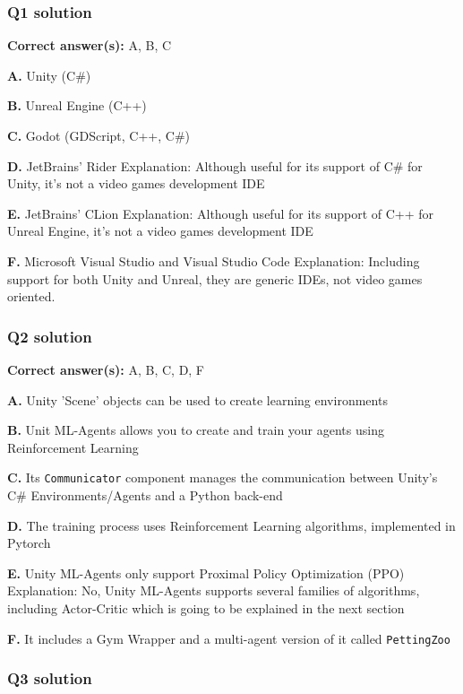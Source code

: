 \documentclass[11pt,a4paper]{article}
\begin{document}
\subsubsection{Q1 solution}\label{q1-solution}

\textbf{Correct answer(s):} A, B, C

\textbf{A.} Unity (C\#)

\textbf{B.} Unreal Engine (C++)

\textbf{C.} Godot (GDScript, C++, C\#)

\textbf{D.} JetBrains' Rider Explanation: Although useful for its support of C\# for Unity, it's not a video games development IDE

\textbf{E.} JetBrains' CLion Explanation: Although useful for its support of C++ for Unreal Engine, it's not a video games development IDE

\textbf{F.} Microsoft Visual Studio and Visual Studio Code Explanation: Including support for both Unity and Unreal, they are generic IDEs, not video games oriented.

\subsubsection{Q2 solution}\label{q2-solution}

\textbf{Correct answer(s):} A, B, C, D, F

\textbf{A.} Unity 'Scene' objects can be used to create learning environments

\textbf{B.} Unit ML-Agents allows you to create and train your agents using Reinforcement Learning

\textbf{C.} Its \texttt{Communicator} component manages the communication between Unity's C\# Environments/Agents and a Python back-end

\textbf{D.} The training process uses Reinforcement Learning algorithms, implemented in Pytorch

\textbf{E.} Unity ML-Agents only support Proximal Policy Optimization (PPO) Explanation: No, Unity ML-Agents supports several families of algorithms, including Actor-Critic which is going to be explained in the next section

\textbf{F.} It includes a Gym Wrapper and a multi-agent version of it called \texttt{PettingZoo}

\subsubsection{Q3 solution}\label{q3-solution}
\end{document}
